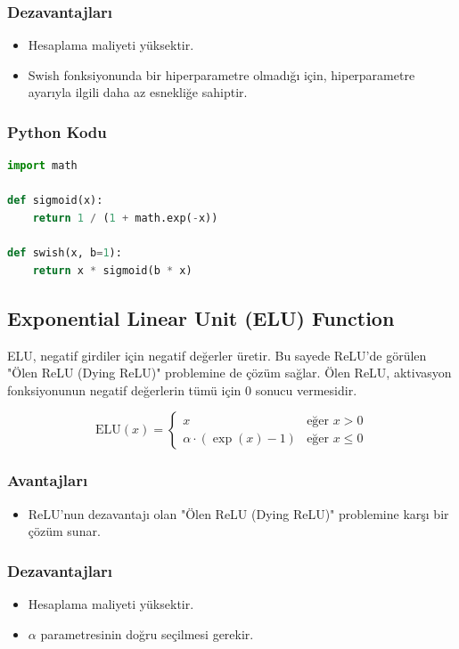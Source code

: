 \subsubsection{Dezavantajları}
\begin{itemize}
    \item Hesaplama maliyeti yüksektir.
    \item Swish fonksiyonunda bir hiperparametre olmadığı için, hiperparametre ayarıyla ilgili daha az esnekliğe sahiptir.
\end{itemize}

\subsubsection{Python Kodu}

\begin{lstlisting}[language=Python]
import math

def sigmoid(x):
    return 1 / (1 + math.exp(-x))

def swish(x, b=1):
    return x * sigmoid(b * x)
\end{lstlisting}

\newpage

\subsection{Exponential Linear Unit (ELU) Function}

ELU, negatif girdiler için negatif değerler üretir. Bu sayede ReLU'de görülen "Ölen ReLU (Dying ReLU)" problemine de çözüm sağlar. Ölen ReLU, aktivasyon fonksiyonunun negatif değerlerin tümü için 0 sonucu vermesidir.

\[ \text{ELU}(x) = 
\begin{cases} 
x & \text{eğer } x > 0 \\
\alpha \cdot (\exp(x) - 1) & \text{eğer } x \leq 0
\end{cases}
\]

\subsubsection{Avantajları}
\begin{itemize}
    \item ReLU'nun dezavantajı olan "Ölen ReLU (Dying ReLU)" problemine karşı bir çözüm sunar.
\end{itemize}

\subsubsection{Dezavantajları}
\begin{itemize}
    \item Hesaplama maliyeti yüksektir.
    \item $\alpha$ parametresinin doğru seçilmesi gerekir.
\end{itemize}

